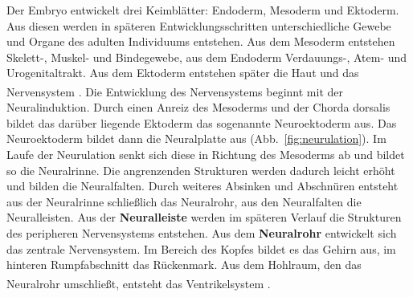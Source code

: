 \documentclass[12pt,a4paper,pdftex]{article}
\begin{document}
\begin{minipage}[b]{0.68\textwidth}
Der Embryo entwickelt drei Keimblätter: Endoderm, Mesoderm und Ektoderm. Aus diesen werden in späteren Entwicklungsschritten unterschiedliche Gewebe und Organe des adulten Individuums entstehen. Aus dem Mesoderm entstehen Skelett-, Muskel- und Bindegewebe, aus dem Endoderm Verdauungs-, Atem- und Urogenitaltrakt. Aus dem Ektoderm entstehen später die Haut und das Nervensystem \textsuperscript{\cite[1]{crossman2014neuroanatomy}}. Die Entwicklung des Nervensystems beginnt mit der Neuralinduktion. Durch einen Anreiz des Mesoderms und der Chorda dorsalis bildet das darüber liegende Ektoderm das sogenannte Neuroektoderm aus. Das Neuroektoderm bildet dann die Neuralplatte aus (Abb.~\ref{fig:neurulation}). Im Laufe der Neurulation senkt sich diese in Richtung des Mesoderms ab und bildet so die Neuralrinne. Die angrenzenden Strukturen werden dadurch leicht erhöht und bilden die Neuralfalten. Durch weiteres Absinken und Abschnüren entsteht aus der Neuralrinne schließlich das Neuralrohr, aus den Neuralfalten die Neuralleisten. Aus der \textbf{Neuralleiste} werden im späteren Verlauf die Strukturen des peripheren Nervensystems entstehen. Aus dem \textbf{Neuralrohr} entwickelt sich das zentrale Nervensystem. Im Bereich des Kopfes bildet es das Gehirn aus, im hinteren Rumpfabschnitt das Rückenmark. Aus dem Hohlraum, den das Neuralrohr umschließt, entsteht das Ventrikelsystem \textsuperscript{\cite[1]{trepel2011neuroanatomie}}.
\end{minipage} \hspace{0.1cm}
\end{document}
